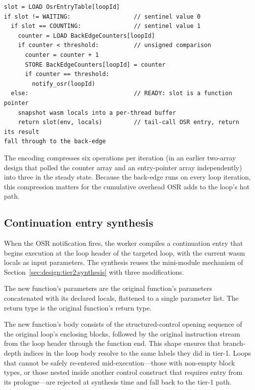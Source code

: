 \begin{lstlisting}[caption={Back-edge instrumentation diamond (pseudocode).}, label={lst:design:diamond}]
slot = LOAD OsrEntryTable[loopId]
if slot != WAITING:                  // sentinel value 0
  if slot == COUNTING:               // sentinel value 1
    counter = LOAD BackEdgeCounters[loopId]
    if counter < threshold:          // unsigned comparison
      counter = counter + 1
      STORE BackEdgeCounters[loopId] = counter
      if counter == threshold:
        notify_osr(loopId)
  else:                              // READY: slot is a function pointer
    snapshot wasm locals into a per-thread buffer
    return slot(env, locals)         // tail-call OSR entry, return its result
fall through to the back-edge
\end{lstlisting}

The encoding compresses six operations per iteration (in an earlier two-array design that polled the counter array and an entry-pointer array independently) into three in the steady state. Because the back-edge runs on every loop iteration, this compression matters for the cumulative overhead OSR adds to the loop's hot path.

\subsection{Continuation entry synthesis}
\label{sec:design:osr:synthesis}

When the OSR notification fires, the worker compiles a continuation entry that begins execution at the loop header of the targeted loop, with the current wasm locals as input parameters. The synthesis reuses the mini-module mechanism of Section~\ref{sec:design:tier2:synthesis} with three modifications.

The new function's parameters are the original function's parameters concatenated with its declared locals, flattened to a single parameter list. The return type is the original function's return type.

The new function's body consists of the structured-control opening sequence of the original loop's enclosing blocks, followed by the original instruction stream from the loop header through the function end. This shape ensures that branch-depth indices in the loop body resolve to the same labels they did in tier-1. Loops that cannot be safely re-entered mid-execution---those with non-empty block types, or those nested inside another control construct that requires entry from its prologue---are rejected at synthesis time and fall back to the tier-1 path.

